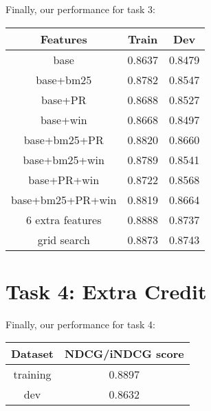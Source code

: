 \documentclass[10pt,twocolumn]{article}
\begin{document}
Finally, our performance for task 3:
\begin{table}[H]
\centering
\begin{tabular}{|c|c|c|}
\hline
Features &Train& Dev \\\hline
base & 0.8637 & 0.8479\\\hline
base+bm25 & 0.8782 & 0.8547\\\hline
base+PR & 0.8688 & 0.8527\\\hline
base+win & 0.8668 & 0.8497\\\hline
base+bm25+PR & 0.8820 & 0.8660\\\hline
base+bm25+win & 0.8789 & 0.8541\\\hline
base+PR+win & 0.8722 & 0.8568\\\hline
base+bm25+PR+win & 0.8819 & 0.8664\\\hline
6 extra features & 0.8888 & 0.8737\\\hline
grid search  & 0.8873 & 0.8743\\\hline
\end{tabular}
\end{table}

\section*{Task 4: Extra Credit}
Finally, our performance for task 4:
\begin{table}[H]
\centering
\begin{tabular}{|c|c|}
\hline
Dataset & NDCG/iNDCG score \\\hline
training & 0.8897\\\hline
dev & 0.8632\\\hline
\end{tabular}
\end{table}
\end{document}
